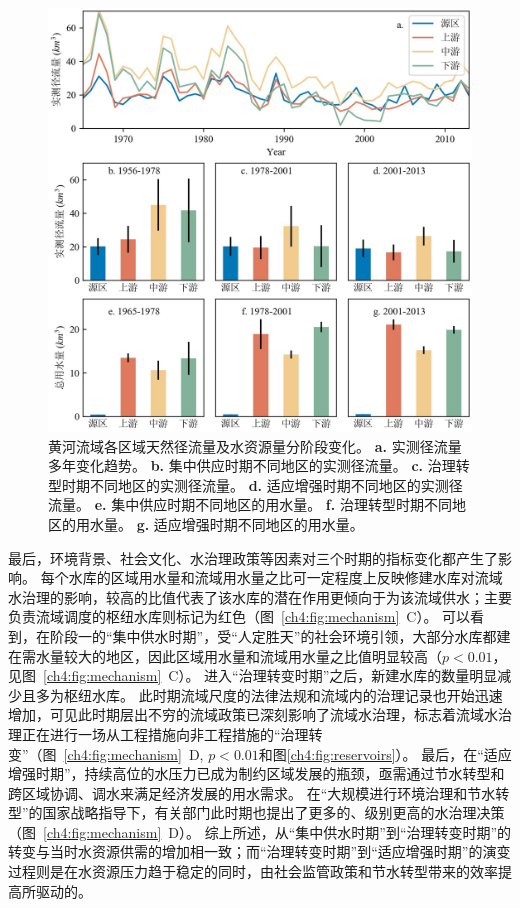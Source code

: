 \begin{figure}[!h]
	\centering
	\includegraphics[width=\textwidth]{img/ch4/ch4_natural_water.jpg}
	\caption[黄河流域各区域天然径流量及水资源量分阶段变化]{
        黄河流域各区域天然径流量及水资源量分阶段变化。
        \textbf{a.} 实测径流量多年变化趋势。
        \textbf{b.} 集中供应时期不同地区的实测径流量。
        \textbf{c.} 治理转型时期不同地区的实测径流量。
        \textbf{d.} 适应增强时期不同地区的实测径流量。
        \textbf{e.} 集中供应时期不同地区的用水量。
        \textbf{f.} 治理转型时期不同地区的用水量。
        \textbf{g.} 适应增强时期不同地区的用水量。
    }\label{ch4:fig:natural}
\end{figure}

最后，环境背景、社会文化、水治理政策等因素对三个时期的指标变化都产生了影响。
每个水库的区域用水量和流域用水量之比可一定程度上反映修建水库对流域水治理的影响，较高的比值代表了该水库的潜在作用更倾向于为该流域供水；主要负责流域调度的枢纽水库则标记为红色（图~\ref{ch4:fig:mechanism}~C）。
可以看到，在阶段一的“集中供水时期”，受“人定胜天”的社会环境引领，大部分水库都建在需水量较大的地区，因此区域用水量和流域用水量之比值明显较高（$p<0.01$，见图~\ref{ch4:fig:mechanism}~C）。
进入“治理转变时期”之后，新建水库的数量明显减少且多为枢纽水库。
此时期流域尺度的法律法规和流域内的治理记录也开始迅速增加，可见此时期层出不穷的流域政策已深刻影响了流域水治理，标志着流域水治理正在进行一场从工程措施向非工程措施的“治理转变”（图~\ref{ch4:fig:mechanism}~D, $p<0.01$和图\ref{ch4:fig:reservoirs}）。
最后，在“适应增强时期”，持续高位的水压力已成为制约区域发展的瓶颈，亟需通过节水转型和跨区域协调、调水来满足经济发展的用水需求。
在“大规模进行环境治理和节水转型”的国家战略指导下，有关部门此时期也提出了更多的、级别更高的水治理决策（图~\ref{ch4:fig:mechanism}~D）。
综上所述，从“集中供水时期”到“治理转变时期”的转变与当时水资源供需的增加相一致；而“治理转变时期”到“适应增强时期”的演变过程则是在水资源压力趋于稳定的同时，由社会监管政策和节水转型带来的效率提高所驱动的。
